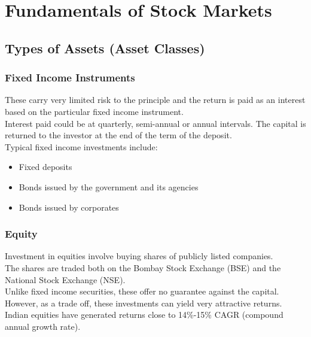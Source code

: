 \chapter{Fundamentals of Stock Markets}

\section{Types of Assets (Asset Classes)}


\subsection{Fixed Income Instruments}
These carry very limited risk to the principle and the return is paid as an interest based on the particular fixed income instrument.
\\
Interest paid could be at quarterly, semi-annual or annual intervals.
The capital is returned to the investor at the end of the term of the deposit.
\\
Typical fixed income investments include:
\begin{itemize}
  \item Fixed deposits
  \item Bonds issued by the government and its agencies
  \item Bonds issued by corporates
\end{itemize}

\subsection{Equity}
Investment in equities involve buying shares of publicly listed companies.
\\
The shares are traded both on the Bombay Stock Exchange (BSE) and the National Stock Exchange (NSE).
\\
Unlike fixed income securities, these offer no guarantee against the capital. However, as a trade off, these investments can yield very attractive returns. Indian equities have generated returns close to 14\%-15\% CAGR (compound annual growth rate).

